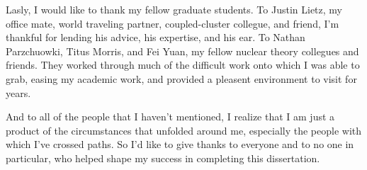 \documentclass[../thesis.tex]{subfiles}
\begin{document}
Lasly, I would like to thank my fellow graduate students.  To Justin Lietz, my office mate, world traveling partner, coupled-cluster collegue, and friend, I'm thankful for lending his advice, his expertise, and his ear.  To Nathan Parzchuowki, Titus Morris, and Fei Yuan, my fellow nuclear theory collegues and friends.  They worked through much of the difficult work onto which I was able to grab, easing my academic work, and provided a pleasent environment to visit for years.

And to all of the people that I haven't mentioned, I realize that I am just a product of the circumstances that unfolded around me, especially the people with which I've crossed paths.  So I'd like to give thanks to everyone and to no one in particular, who helped shape my success in completing this dissertation.
\end{document}
